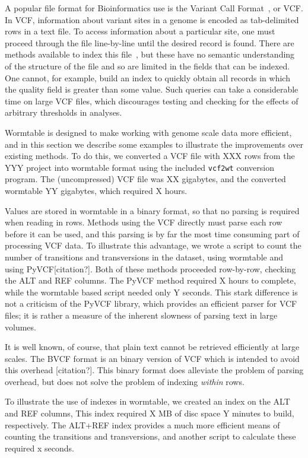 \documentclass{bioinfo}
\begin{document}
A popular file format for Bioinformatics use is the Variant Call Format~\citep{da+11},
or VCF. In VCF,  information about variant sites in a genome is encoded 
as tab-delimited rows in a text file. To access information about a 
particular site, one must proceed through the file line-by-line until the 
desired record is found. There are methods available to index this 
file~\citep{li11}, but these have no semantic 
understanding of the structure of the file and so are limited in the 
fields that can be indexed. One cannot, for example, build an index 
to quickly obtain all records in which the quality field is greater
than some value. Such queries can take a considerable time on large VCF 
files, which discourages testing and checking for the effects of 
arbitrary thresholds in analyses.

Wormtable is designed to make working with genome scale data more 
efficient, and in this section we describe some examples to 
illustrate the improvements over existing methods. To do this, 
we converted a VCF file with XXX rows from the YYY project 
into wormtable format using the included \texttt{vcf2wt} 
conversion program.  The (uncompressed) VCF file was XX
gigabytes, and the converted wormtable YY gigabytes, which required 
X hours.

Values are stored in wormtable in a binary format, so that no parsing is
required when reading in rows. Methods using the VCF directly must parse 
each row before it can be used, and this parsing is by far the most time 
consuming part of processing VCF data. To illustrate this advantage, we
wrote a script to count the number of transitions and transversions
in the dataset, using wormtable and using PyVCF[citation?]. Both of these
methods proceeded row-by-row, checking the ALT and REF columns. The 
PyVCF method required X hours to complete, while the wormtable 
based script needed only Y seconds. This stark difference is not a 
criticism of the PyVCF library, which provides an efficient parser 
for VCF files; it is rather a measure of the inherent slowness of
parsing text in large volumes.

It is well known, of course, that plain text cannot be retrieved 
efficiently at large scales. The BVCF format is an binary version 
of VCF which is intended to avoid this overhead [citation?]. 
This binary format does alleviate the problem of parsing overhead,
but does not solve the problem of indexing \emph{within} rows.

To illustrate the use of indexes in wormtable, 
we created an index on the ALT and REF columns, 
This index required X MB of disc space Y minutes to build, respectively. 
The ALT+REF index provides a much more efficient means of counting 
the transitions and transversions, and another script to calculate 
these required x seconds. 
\end{document}
